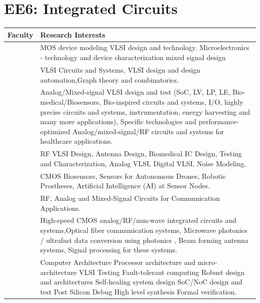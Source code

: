 \documentclass[openany]{book} %
\begin{document}
\section{EE6: Integrated Circuits}
\begin{tabular}{p{4.5cm} p{9cm}}
\hline 
\hline
Faculty  & Research Interests \\ 
\hline
\hline

\href{https://www.ee.iitb.ac.in/wiki/faculty/dinesh}{\color{blue}{Prof. Dinesh K. Sharma}} & MOS device modeling VLSI design and technology. Microelectronics - technology and device characterization mixed signal design \\
\hline

\href{https://www.ee.iitb.ac.in/~madhav/}{\color{blue}{Prof. Madhav P. Desai}} & VLSI Circuits and Systems, VLSI design and design automation,Graph theory and combinatorics.\\ 
\hline

\href{https://www.ee.iitb.ac.in/wiki/faculty/mshojaei}{\color{blue}{Prof. Maryam Shojaei Baghini}} & Analog/Mixed-signal VLSI design and test (SoC, LV, LP, LE, Bio-
medical/Biosensors, Bio-inspired circuits and systems, I/O, highly precise circuits and systems, instrumentation, energy harvesting and many more applications), Specific technologies and performance-optimized Analog/mixed-signal/RF circuits and systems for healthcare applications.\\ 
\hline

\href{https://www.ee.iitb.ac.in/web/people/faculty/home/jayanta}{\color{blue}{Prof. Jayanta Mukherjee}} & RF VLSI Design, Antenna Design, Biomedical IC Design, Testing and Characterization, Analog VLSI, Digital VLSI, Noise Modeling.\\
\hline

\href{https://www.ee.iitb.ac.in/web/people/faculty/home/pramodm}{\color{blue}{Prof. Pramod Murali }} & CMOS Biosensors, Sensors for Autonomous Drones, Robotic Prostheses, Artificial Intelligence (AI) at Sensor Nodes.\\
\hline

\href{https://www.ee.iitb.ac.in/web/people/faculty/home/rajeshzele}{\color{blue}{Prof. Rajesh H. Zele }} & RF, Analog and Mixed-Signal Circuits for Communication Applications. \\
\hline

\href{https://www.ee.iitb.ac.in/wiki/faculty/shalabh}{\color{blue}{Prof. Shalabh Gupta }} & High-speed CMOS analog/RF/mm-wave integrated circuits and systems,Optical fiber communication systems, Microwave photonics / ultrafast data  conversion using photonics , Beam forming antenna systems, Signal processing for these systems.\\ 
\hline

\href{https://www.ee.iitb.ac.in/~viren/}{\color{blue}{Prof. Virendra Singh}} & Computer Architecture Processor architecture and micro-architecture
VLSI Testing Fault-tolerant computing Robust design and architectures Self-healing system design SoC/NoC design and test Post Silicon Debug High level synthesis Formal verification. \\ 
\hline
\end{tabular}
\end{document}

